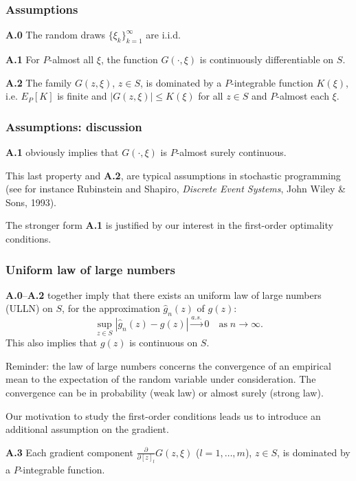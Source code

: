 \documentclass{beamer}
\begin{document}
\begin{frame}
\frametitle{Assumptions}

\noindent
\textbf{A.0}
The random draws $\lbrace \xi_k \rbrace_{k= 1}^{\infty}$ are i.i.d.

\mbox{}

\noindent
\textbf{A.1}
For $P$-almost all $\xi$, the function $G(\cdot, \xi)$ is continuously differentiable on $S$.

\mbox{}

\noindent
\textbf{A.2}
The family $G(z, \xi)$, $z \in S$, is dominated by a $P$-integrable function $K(\xi)$, i.e. $E_P[K]$ is finite and $| G(z, \xi) | \leq K(\xi)$ for all $z \in S$ and $P$-almost each $\xi$.

\end{frame}

\begin{frame}
\frametitle{Assumptions: discussion}

\textbf{A.1} obviously implies that $G(\cdot, \xi)$ is $P$-almost surely continuous.

\mbox{}

This last property and \textbf{A.2}, are typical assumptions in stochastic programming (see for instance Rubinstein and Shapiro, {\sl Discrete Event Systems}, John Wiley \& Sons, 1993).

\mbox{}

The stronger form \textbf{A.1} is justified by our interest in the first-order optimality conditions.%

\end{frame}

\begin{frame}
\frametitle{Uniform law of large numbers}

\textbf{A.0}--\textbf{A.2} together imply that there exists an {\blue uniform law of large numbers (ULLN)} on $S$, for the approximation $\hat{g}_n(z)$ of $g(z)$:%
\[
\sup_{z \in S} \left| \hat{g}_n(z) - g(z) \right|
\overset{a.s.}{\longrightarrow} 0
\quad \mbox{as} \; n \rightarrow \infty.
\]
This also implies that $g(z)$ is continuous on $S$.

\mbox{}

\begin{footnotesize}
Reminder: the law of large numbers concerns the convergence of an empirical mean to the expectation of the random variable under consideration.
The convergence can be in probability (weak law) or almost surely (strong law).
\end{footnotesize}

\mbox{}

Our motivation to study the first-order conditions leads us to introduce an additional assumption on the gradient.

\mbox{}

\noindent
\textbf{A.3}
Each gradient component $\frac{\partial}{\partial [z]_l} G(z, \xi)$ ($l = 1,\ldots,m$), $z \in S$, is dominated by a $P$-integrable function.

\end{frame}
\end{document}
